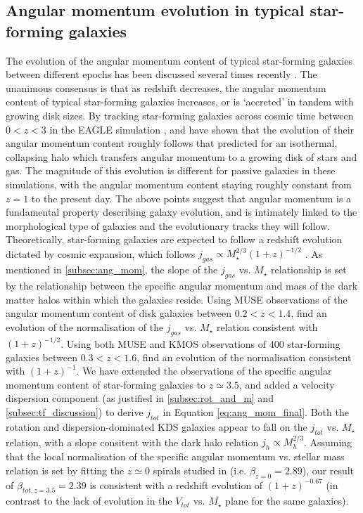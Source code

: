 \documentclass[fleqn,usenatbib]{mnras}
\begin{document}
\subsection{Angular momentum evolution in typical star-forming galaxies}\label{subsec:angmom_discussion}
The evolution of the angular momentum content of typical star-forming galaxies between different epochs has been discussed several times recently \citep[e.g.][]{Genel2015,Teklu2015,Burkert2016a,Contini2015a,Obreschkow2016,Lagos2017,Harrison2017a,Swinbank2017}.
The unanimous consensus is that as redshift decreases, the angular momentum content of typical star-forming galaxies increases, or is `accreted' in tandem with growing disk sizes.
By tracking star-forming galaxies across cosmic time between $0 < z < 3$ in the EAGLE simulation \citep{Schaye2015}, \cite{Lagos2017} and \cite{Swinbank2017} have shown that the evolution of their angular momentum content roughly follows that predicted for an isothermal, collapsing halo which transfers angular momentum to a growing disk of stars and gas.
The magnitude of this evolution is different for passive galaxies in these simulations, with the angular momentum content staying roughly constant from $z = 1$ to the present day.
The above points suggest that angular momentum is a fundamental property describing galaxy evolution, and is intimately linked to the morphological type of galaxies and the evolutionary tracks they will follow. \\

\noindent
Theoretically, star-forming galaxies are expected to follow a redshift evolution dictated by cosmic expansion, which follows $j_{gas} \propto M_{\star}^{2/3}(1 + z)^{-1/2}$ \citep[e.g.][]{Obreschkow2016}.
As mentioned in \cref{subsec:ang_mom}, the slope of the $j_{gas}$ vs. $M_{\star}$ relationship is set by the relationship between the specific angular momentum and mass of the dark matter halos within which the galaxies reside.
Using MUSE observations of the angular momentum content of disk galaxies between $0.2 < z < 1.4$, \cite{Contini2015a} find an evolution of the normalisation of the $j_{gas}$ vs. $M_{\star}$ relation consistent with $(1 + z)^{-1/2}$.
Using both MUSE and KMOS observations of 400 star-forming galaxies between $0.3 < z < 1.6$, \cite{Swinbank2017} find an evolution of the normalisation consistent with $(1 + z)^{-1}$.
We have extended the observations of the specific angular momentum content of star-forming galaxies to $z\simeq3.5$, and added a velocity dispersion component (as justified in \cref{subsec:rot_and_m} and \cref{subsec:tf_discussion}) to derive $j_{tot}$ in Equation \ref{eq:ang_mom_final}.
Both the rotation and dispersion-dominated KDS galaxies appear to fall on the $j_{tot}$ vs. $M_{\star}$ relation, with a slope consitent with the dark halo relation $j_{h} \propto M_{h}^{2/3}$.
Assuming that the local normalisation of the specific angular momentum vs. stellar mass relation is set by fitting the $z\simeq0$ spirals studied in \cite{Romanowsky2012} (i.e. $\beta_{z=0} = 2.89$), our result of $\beta_{tot,z=3.5} = 2.39$ is consistent with a redshift evolution of $(1 + z)^{-0.67}$ (in contrast to the lack of evolution in the $V_{tot}$ vs. $M_{\star}$ plane for the same galaxies). \\ 
\end{document}
